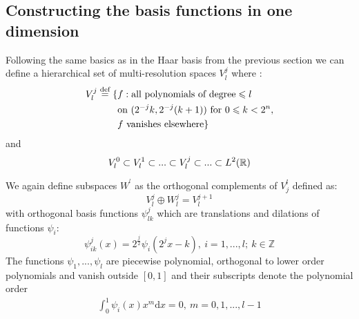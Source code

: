 \documentclass[../master_thesis.tex]{subfiles}
\begin{document}
\subsection{Constructing the basis functions in one dimension}
Following the same basics as in the Haar basis from the previous section we can
define a hierarchical set of multi-resolution spaces $V^j_l$ where \cite{Frediani:2013}:
\begin{align}
  \begin{split}
    V^j_l \stackrel{\text{def}}{=} \{&f: \text{all polynomials of degree} \leqslant
    l\  \\
    &\text{on}\  (2^{-j}k,2^{-j}(k+1))\ \text{for}\ 0\leqslant k < 2^{n},\\
    &f\  \text{vanishes elsewhere}\}
  \end{split}
\end{align}
and
\begin{equation}
  V^0_l \subset V^1_l \subset ... \subset V_l^j \subset ... \subset L^2(\mathbb{R})
\end{equation}

We again define subspaces $W^^l$ as the orthogonal complements of $V^l_j$
\cite{Alpert1993} defined as:
\begin{equation}
  V_l^j \oplus W^j_l = V_l^{j+1}
\end{equation}
 with orthogonal basis functions  $\psi^j_{lk}$ which are translations and dilations of functions $\psi_i$:
 \begin{equation}
   \psi^j_{ik}(x) = 2^\frac{j}{2}\psi_i(2^jx-k), \ i=1, ...,l;\ k \in \mathbb{Z}\label{eq:mwbasisfuncs}
 \end{equation}
 The functions $\psi_1, ...,\psi_l$ are piecewise polynomial, orthogonal to lower order polynomials and
 vanish outside $[0,1]$ and their subscripts denote the polynomial order \cite{Alpert1993}
\begin{align}
  \int_0^1\psi_i(x)x^m \text{d}x = 0,\ m = 0, 1, ..., l-1
\end{align}
\end{document}
